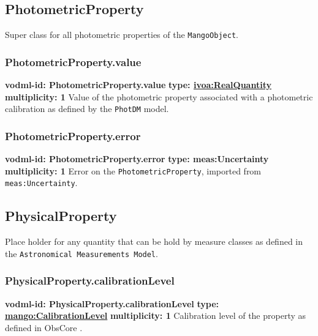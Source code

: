   \subsection{PhotometricProperty}
  \label{sect:PhotometricProperty}
    Super class for all photometric properties of the \texttt{MangoObject}.

    \subsubsection{PhotometricProperty.value}
      \textbf{vodml-id: PhotometricProperty.value} \newline
      \textbf{type: \hyperref[sect:ivoa]{ivoa:RealQuantity}} \newline
      \textbf{multiplicity: 1} \newline
      Value of the photometric property associated with a photometric calibration as defined by the \texttt{PhotDM} model.

    \subsubsection{PhotometricProperty.error}
      \textbf{vodml-id: PhotometricProperty.error} \newline
      \textbf{type: meas:Uncertainty} \newline
      \textbf{multiplicity: 1} \newline
      Error on the \texttt{PhotometricProperty}, imported from \texttt{meas:Uncertainty}.

  \subsection{PhysicalProperty}
  \label{sect:PhysicalProperty}
    Place holder for any quantity that can be hold by measure classes as defined in the \texttt{Astronomical Measurements Model}.

    \subsubsection{PhysicalProperty.calibrationLevel}
      \textbf{vodml-id: PhysicalProperty.calibrationLevel} \newline
      \textbf{type: \hyperref[sect:CalibrationLevel]{mango:CalibrationLevel}} \newline
      \textbf{multiplicity: 1} \newline
      Calibration level of the property as defined in ObsCore \citep{2011ivoa.spec.1028T}.

